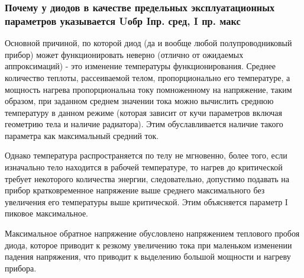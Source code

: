 \subsubsection{Почему у диодов в качестве предельных эксплуатационных параметров указывается Uобр Iпр. сред, I пр. макс}

Основной причиной, по которой диод (да и вообще любой полупроводниковый прибор) может функционировать неверно (отлично от ожидаемых аппроксимаций) - это изменение температуры функционирования.
Среднее количество теплоты, рассеиваемой телом, пропорционально его температуре, а мощность нагрева пропорциональна току помноженному на напряжение, таким образом, при заданном среднем значении тока можно вычислить среднюю температуру в данном режиме (которая зависит от кучи параметров включая геометрию тела и наличие радиатора). Этим обуславливается наличие такого параметра как максимальный средний ток.


Однако температура распространяется по телу не мгновенно, более того, если изначально тело находится в рабочей температуре, то нагрев до критической требует некоторого количества энергии, следовательно, допустимо подавать на прибор кратковременное напряжение выше среднего максимального без увеличения его температуры выше критической. Этим объясняется параметр I пиковое максимальное.


Максимальное обратное напряжение обусловлено напряжением теплового пробоя диода, которое приводит к резкому увеличению тока при маленьком изменении падения напряжения, что приводит к выделению большой мощности и нагреву прибора. 

